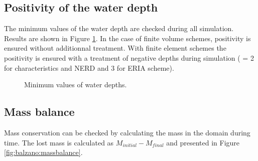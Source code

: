 


\subsection{Positivity of the water depth}

The minimum values of the water depth are checked during all simulation.
Results are shown in Figure \ref{t2d:balzano:minmax}.
In the case of finite volume schemes, positivity is ensured without additionnal
treatment.
With finite element schemes the positivity is ensured with a treatment of
negative depths during simulation ( = 2
for characteristics and NERD and 3 for ERIA scheme).

\begin{figure}[H]
\centering
{}
\caption{Minimum values of water depths.}
\label{t2d:balzano:minmax}
\end{figure}

\subsection{Mass balance}

Mass conservation can be checked by calculating the mass in the domain during
time. The lost mass is calculated as
$M_{initial} - M_{final}$ and presented in Figure \ref{fig:balzano:massbalance}.


